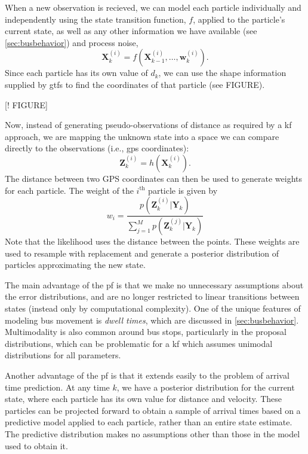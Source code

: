 \documentclass[12pt,a4paper]{article}
\newcommand{\bY}{\mathbf{Y}}
\newcommand{\bX}{\mathbf{X}}
\newcommand{\bZ}{\mathbf{Z}}
\newcommand{\mat}[1]{\mathbf{#1}}
\begin{document}
When a new observation is recieved,
we can model each particle individually and independently using the state transition function, $f$,
applied to the particle's current state,
as well as any other information we have available (see \cref{sec:busbehavior}) and process noise,
\begin{equation}
  \label{eq:pf_statetransition}
  \bX_k^{(i)} = f(\bX_{k-1}^{(i)}, \ldots, \mat{w}_k^{(i)}).
\end{equation}
Since each particle has its own value of $d_k$, 
we can use the shape information supplied by \gls{gtfs} to
find the coordinates of that particle (see FIGURE).

[! FIGURE]

Now, instead of generating pseudo-observations of distance
as required by a \gls{kf} approach, we are mapping the unknown state into 
a space we can compare directly to the observations (i.e., \gls{gps} coordinates):
\begin{equation}
  \label{eq:pf_measurement}
  \bZ_k^{(i)} = h(\bX_k^{(i)}).
\end{equation}
The distance between two GPS coordinates can then be used to generate weights for each particle.
The weight of the $i^{\mathrm{th}}$ particle is given by
\begin{equation}
  \label{eq:pf_likelihood}
  w_i = \frac{p(\bZ_k^{(i)} | \bY_k)}{\sum_{j=1}^M p(\bZ_k^{(j)} | \bY_k)}
\end{equation}
Note that the likelihood uses the distance between the points.
These weights are used to resample with replacement and generate a posterior distribution 
of particles approximating the new state.


The main advantage of the \gls{pf} is that we make no unnecessary 
assumptions about the error distributions, 
and are no longer restricted to linear transitions between states 
(instead only by computational complexity).
One of the unique features of modeling bus movement
is \emph{dwell times}, which are discussed in \cref{sec:busbehavior}.
Multimodality is also common around bus stops, particularly in the proposal distributions, 
which can be problematic for a \gls{kf} 
which assumes unimodal distributions for all parameters.


Another advantage of the \gls{pf} is that it extends easily to the problem of arrival time prediction.
At any time $k$, we have a posterior distribution for the current state,
where each particle has its own value for distance and velocity. 
These particles can be projected forward to obtain a sample of arrival times
based on a predictive model applied to each particle,
rather than an entire state estimate.
The predictive distribution makes no assumptions other than those in the model
used to obtain it.
\end{document}
